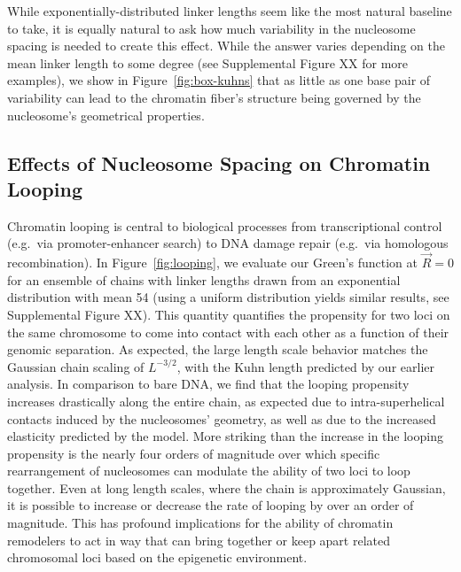 \documentclass[%
 reprint,
superscriptaddress,
showpacs,preprintnumbers,
 amsmath,amssymb,
 aps,
 prl,
]{revtex4-1}
\begin{document}
While exponentially-distributed linker lengths seem like the most natural
    baseline to take, it is equally natural to ask how much variability in the
    nucleosome spacing is needed to create this effect.
While the answer varies depending on the mean linker length to some degree (see
    Supplemental Figure XX for more examples), we show in
    Figure~\ref{fig:box-kuhns} that as little as one base pair of variability
    can lead to the chromatin fiber's structure being governed by the
    nucleosome's geometrical properties.

\subsection{\label{sec:looping}Effects of Nucleosome Spacing on Chromatin
Looping}

Chromatin looping is central to biological processes from transcriptional
    control (e.g.\ via promoter-enhancer search) to DNA damage repair (e.g.\ via
    homologous recombination).
In Figure~\ref{fig:looping}, we evaluate our Green's function at $\vec{R} = 0$
    for an ensemble of chains with linker lengths drawn from an exponential
    distribution with mean \SI{54}{\basepair} (using a uniform distribution
    yields similar results, see Supplemental Figure XX).
This quantity quantifies the propensity for two loci on the same chromosome to
    come into contact with each other as a function of their genomic separation.
As expected, the large length scale behavior matches the Gaussian chain scaling
    of $L^{-3/2}$, with the Kuhn length predicted by our earlier analysis.
In comparison to bare DNA, we find that the looping propensity increases
    drastically along the entire chain, as expected due to intra-superhelical
    contacts induced by the nucleosomes' geometry, as well as due to the
    increased elasticity predicted by the model.
More striking than the increase in the looping propensity is the nearly four
    orders of magnitude over which specific rearrangement of nucleosomes can
    modulate the ability of two loci to loop together.
Even at long length scales, where the chain is approximately Gaussian, it is
    possible to increase or decrease the rate of looping by over an order of
    magnitude.
This has profound implications for the ability of chromatin remodelers to act in
    way that can bring together or keep apart related chromosomal loci based on
    the epigenetic environment.
\end{document}
